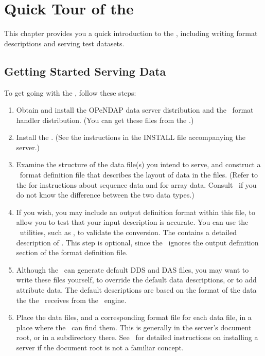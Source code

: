 %
%

\chapter{Quick Tour of the \ffs}
\label{ff,dquick}

This chapter provides you a quick introduction to the \ffs , including
writing format descriptions and serving test datasets.

\section{Getting Started Serving Data}
\label{ff,startup}

To get going with the \ffs , follow these steps:

\begin{enumerate}
\item Obtain and install the OPeNDAP data server distribution and the
  \ffs\ format handler distribution. (You can get these files from the
  \DODShome .)
  
\item Install the \ffs . (See the instructions in the INSTALL file
  accompanying the server.)  

\item Examine the structure of the data file(s) you intend to serve,
  and construct a \ffnd\ format definition file that describes the
  layout of data in the files.  (Refer to the 
  for instructions about sequence data and 
  for array data.  Consult \DODSuser\ if you do not know the
  difference between the two data types.)
  
\item If you wish, you may include an output definition format within
  this file, to allow you to test that your input description is
  accurate.  You can use the \ffnd\ utilities, such as ,
  to validate the conversion.  The  contains a
  detailed description of .  This step is optional, since
  the \ffs\ ignores the output definition section of the format
  definition file.

\item Although the \ffs\ can generate default DDS and DAS files, you
  may want to write these files yourself, to override the default data
  descriptions, or to add attribute data.  The default descriptions
  are based on the format of the data the the \ffs\ receives from the
  \ffnd\ engine.

\item Place the data files, and a corresponding format file for each
  data file, in a place where the \ffs\ can find them.  This is
  generally in the server's document root, or in a subdirectory
  there.  See \DODSuser\ for detailed instructions on installing a
  server if the document root is not a familiar concept.

\end{enumerate}

